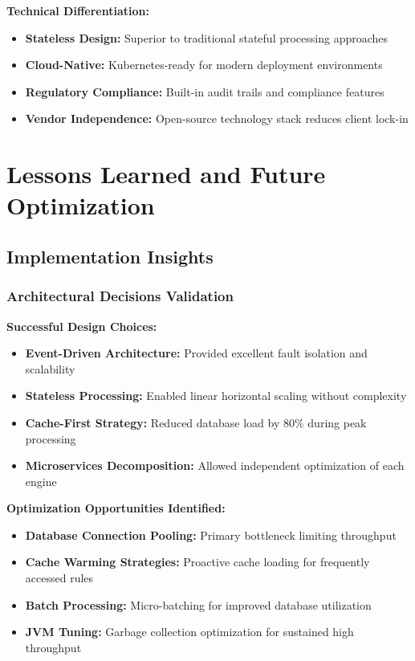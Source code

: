 \textbf{Technical Differentiation:}
\begin{itemize}
    \item \textbf{Stateless Design:} Superior to traditional stateful processing approaches
    \item \textbf{Cloud-Native:} Kubernetes-ready for modern deployment environments
    \item \textbf{Regulatory Compliance:} Built-in audit trails and compliance features
    \item \textbf{Vendor Independence:} Open-source technology stack reduces client lock-in
\end{itemize}

\section{Lessons Learned and Future Optimization}

\subsection{Implementation Insights}

\subsubsection{Architectural Decisions Validation}

\textbf{Successful Design Choices:}
\begin{itemize}
    \item \textbf{Event-Driven Architecture:} Provided excellent fault isolation and scalability
    \item \textbf{Stateless Processing:} Enabled linear horizontal scaling without complexity
    \item \textbf{Cache-First Strategy:} Reduced database load by 80\% during peak processing
    \item \textbf{Microservices Decomposition:} Allowed independent optimization of each engine
\end{itemize}

\textbf{Optimization Opportunities Identified:}
\begin{itemize}
    \item \textbf{Database Connection Pooling:} Primary bottleneck limiting throughput
    \item \textbf{Cache Warming Strategies:} Proactive cache loading for frequently accessed rules
    \item \textbf{Batch Processing:} Micro-batching for improved database utilization
    \item \textbf{JVM Tuning:} Garbage collection optimization for sustained high throughput
\end{itemize}

